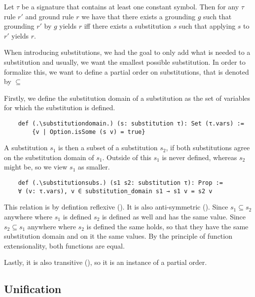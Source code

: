     \begin{theorem}[\groundingSubstitutionEquivalence]\label{trm:groundingSubstitutionEquivalence}
        Let $\tau$ be a signature that contains at least one constant symbol. Then for any $\tau$ rule $r'$ and ground rule $r$ we have that there exists a grounding $g$ such that grounding $r'$ by $g$ yields $r$ iff there exists a substitution $s$ such that applying $s$ to $r'$ yields $r$.
    \end{theorem}

    When introducing substitutions, we had the goal to only add what is needed to a substitution and usually, we want the smallest possible substitution. In order to formalize this, we want to define a partial order on substitutions, that is denoted by $\subseteq$

    Firstly, we define the substitution domain of a substitution as the set of variables for which the substitution is defined. 

    \begin{lstlisting}
    def (.\substitutiondomain.) (s: substitution τ): Set (τ.vars) := 
        {v | Option.isSome (s v) = true}
    \end{lstlisting}

    A substitution $s_1$ is then a subset of a substitution $s_2$, if both substitutions agree on the substitution domain of $s_1$. Outside of this $s_1$ is never defined, whereas $s_2$ might be, so we view $s_1$ as smaller.

    \begin{lstlisting}
    def (.\substitutionsubs.) (s1 s2: substitution τ): Prop :=
    ∀ (v: τ.vars), v ∈ substitution_domain s1 → s1 v = s2 v
    \end{lstlisting}

    This relation is by defintion reflexive (\substitutionsubsrefl). It is also anti-symmetric (\substitutionsubsantisymm). Since $s_1 \subseteq s_2$ anywhere where $s_1$ is defined $s_2$ is defined as well and has the same value. Since $s_2 \subseteq s_1$ anywhere where $s_2$ is defined the same holds, so that they have the same substitution domain and on it the same values. By the principle of function extensionality, both functions are equal.

    Lastly, it is also transitive (\substitutionsubstrans), so it is an instance of a partial order.

\subsection{Unification}

